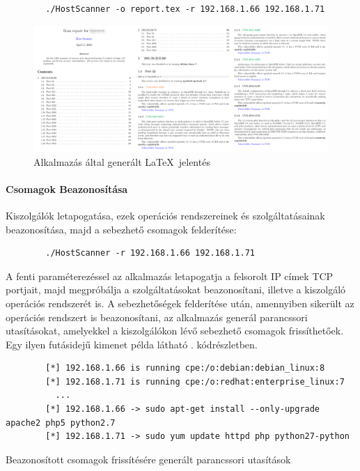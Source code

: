 	\begin{listing}[H]
	\begin{verbatim}
		./HostScanner -o report.tex -r 192.168.1.66 192.168.1.71
	\end{verbatim}
	\end{listing}

	\begin{figure}[!htbp]
		\centering
		\includegraphics[scale=0.07]{reportcap.png}
		\caption{Alkalmazás által generált \LaTeX\ jelentés}
		\label{latexrep}
	\end{figure}

	\paragraph*{Csomagok Beazonosítása} Kiszolgálók letapogatása, ezek operációs rendszereinek és szolgáltatásainak beazonosítása, majd a sebezhető csomagok felderítése:

	\begin{listing}[H]
	\begin{verbatim}
		./HostScanner -r 192.168.1.66 192.168.1.71
	\end{verbatim}
	\end{listing}

	\vspace{-0.25in}
	A fenti paraméterezéssel az alkalmazás letapogatja a felsorolt IP címek TCP portjait, majd megpróbálja a szolgáltatásokat beazonosítani, illetve a kiszolgáló operációs rendszerét is. A sebezhetőségek felderítése után, amennyiben sikerült az operációs rendszert is beazonosítani, az alkalmazás generál parancssori utasításokat, amelyekkel a kiszolgálókon lévő sebezhető csomagok frissíthetőek. Egy ilyen futásidejű kimenet példa látható \az{\ref{pkgupdt}}. kódrészletben.

	\begin{listing}[H]
		\begin{verbatim}
		[*] 192.168.1.66 is running cpe:/o:debian:debian_linux:8
		[*] 192.168.1.71 is running cpe:/o:redhat:enterprise_linux:7
		  ...
		[*] 192.168.1.66 -> sudo apt-get install --only-upgrade apache2 php5 python2.7
		[*] 192.168.1.71 -> sudo yum update httpd php python27-python
		\end{verbatim}
		\caption{Beazonosított csomagok frissítésére generált parancssori utasítások}
		\label{pkgupdt}
	\end{listing}

